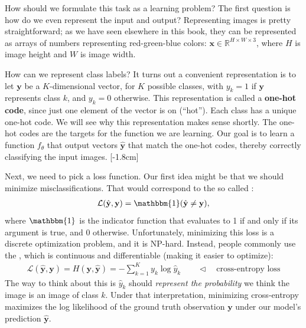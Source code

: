 How should we formulate this task as a learning problem? The first question is how do we even represent the input and output? Representing images is pretty straightforward; as we have seen elsewhere in this book, they can be represented as arrays of numbers representing red-green-blue colors: $\mathbf{x} \in \mathbb{R}^{H \times W \times 3}$, where $H$ is image height and $W$ is image width.

How can we represent class labels? It turns out a convenient representation is to let $\mathbf{y}$ be a $K$-dimensional vector, for $K$ possible classes, with $y_k = 1$ if $\mathbf{y}$ represents class $k$, and $y_k = 0$ otherwise. This representation is called a \textbf{one-hot code}, since just one element of the vector is on (``hot''). Each class has a unique one-hot code. We will see why this representation makes sense shortly. The one-hot codes are the targets for the function we are learning. Our goal is to learn a function $f_{\theta}$ that output vectors $\hat{\mathbf{y}}$ that match the one-hot codes, thereby correctly classifying the input images.
[-1.8cm]

Next, we need to pick a loss function. Our first idea might be that we should minimize misclassifications. That would correspond to the so called :
\begin{align}
    \mathcal{L}(\hat{\mathbf{y}},\mathbf{y}) = \mathbbm{1}(\hat{\mathbf{y}}\neq\mathbf{y}),
\end{align}
where $\mathbbm{1}$ is the indicator function that evaluates to 1 if and only if its argument is true, and 0 otherwise. Unfortunately, minimizing this loss is a discrete optimization problem, and it is NP-hard. Instead, people commonly use the , which is continuous and differentiable (making it easier to optimize):
\begin{align}
    \mathcal{L}(\hat{\mathbf{y}},\mathbf{y}) = H(\mathbf{y}, \hat{\mathbf{y}}) = - \sum_{k=1}^K y_k \log \hat{y}_k \quad\quad \triangleleft \quad \text{cross-entropy loss}
\end{align}
The way to think about this is $\hat{y}_k$ should \textit{represent the probability} we think the image is an image of class $k$. Under that interpretation, minimizing cross-entropy maximizes the log likelihood of the ground truth observation $\mathbf{y}$ under our model's prediction $\hat{\mathbf{y}}$.

